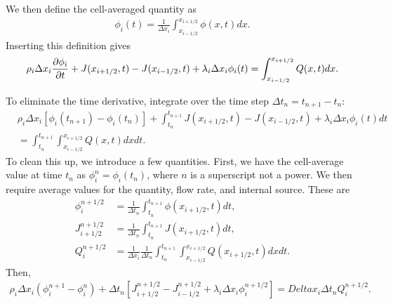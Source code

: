 We then define the cell-averaged quantity as
\begin{align}
  \phi_i(t) = \frac{1}{\Delta x_i} \int_{x_{i-1/2}}^{x_{i+1/2}} \phi(x,t) dx .
\end{align}
Inserting this definition gives
\begin{align}
  \rho_i \Delta x_i \frac{ \partial {\phi_i} }{ \partial {t} }  + J(x_{i+1/2},t) - J(x_{i-1/2},t) + \lambda_i \Delta x_i \phi_i(t) = \int_{x_{i-1/2}}^{x_{i+1/2}} Q(x,t) dx .
\end{align}

To eliminate the time derivative, integrate over the time step $\Delta t_n = t_{n+1} - t_n$:
\begin{align}
  &\rho_i \Delta x_i \left[ \phi_i(t_{n+1}) - \phi_i(t_n) \right]  + \int_{t_{n}}^{t_{n+1}} J(x_{i+1/2},t) - J(x_{i-1/2},t) + \lambda_i \Delta x_i \phi_i(t) dt  \nonumber \\ 
  &= \int_{t_{n}}^{t_{n+1}} \int_{x_{i-1/2}}^{x_{i+1/2}} Q(x,t) dx dt.
\end{align}
To clean this up, we introduce a few quantities. First, we have the cell-average value at time $t_n$ as $\phi_i^n = \phi_i(t_n)$, where $n$ is a superscript not a power. We then require average values for the quantity, flow rate, and internal source. These are
\begin{subequations}
\begin{align}
  \phi_i^{n+1/2}    &= \frac{1}{\Delta t_n} \int_{t_{n}}^{t_{n+1}} \phi(x_{i+1/2},t) dt , \\
  J_{i+1/2}^{n+1/2} &= \frac{1}{\Delta t_n} \int_{t_{n}}^{t_{n+1}}    J(x_{i+1/2},t) dt , \\
  Q_i^{n+1/2}       &= \frac{1}{\Delta x_i} \frac{1}{\Delta t_n} \int_{t_{n}}^{t_{n+1}} \int_{x_{i-1/2}}^{x_{i+1/2}}   Q(x_{i+1/2},t) dx dt .
\end{align}
\end{subequations}
Then,
\begin{align}
  \rho_i \Delta x_i \left( \phi_i^{n+1} - \phi_i^n \right)  + \Delta t_n \left[ J_{i+1/2}^{n+1/2} - J_{i-1/2}^{n+1/2} + \lambda_i \Delta x_i \phi_i^{n+1/2} \right] = Delta x_i \Delta t_n Q_i^{n+1/2}.
\end{align}


